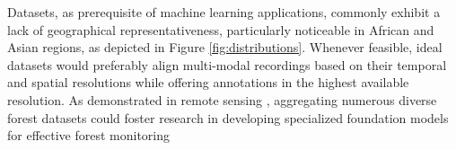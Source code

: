 \documentclass{CUP-JNL-DTM}%
\newcommand{\AOc}[1]{\textcolor{cyan}{[\textbf{Art}: #1]}}
\newcommand{\TKc}[1]{\textcolor{olive}{[\textbf{Tej}: #1]}}
\theoremstyle{definition}
\numberwithin{equation}{section}
\begin{document}
%
%



Datasets, as prerequisite of machine learning applications, commonly exhibit a lack of geographical representativeness, particularly noticeable in African and Asian regions, as depicted in Figure \ref{fig:distributions}. %
Whenever feasible, ideal datasets would preferably align multi-modal recordings based on their temporal and spatial resolutions while offering annotations in the highest available resolution.
As demonstrated in remote sensing \cite{lacoste_geo-bench_2023}, aggregating numerous diverse forest datasets could foster research in developing specialized foundation models for effective forest monitoring
\end{document}
